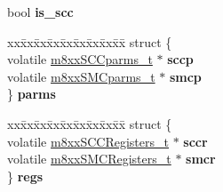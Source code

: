 \begin{DoxyCompactItemize}
\item 
\mbox{\label{structm8xx__console__chan__desc__s_ac400b665e8b186ea18553e57786d08f1}} 
bool {\bfseries is\+\_\+scc}
\item 
\mbox{\label{structm8xx__console__chan__desc__s_ae2109084a3fa835a6ab8444f98ac1bdc}} 
\begin{tabbing}
xx\=xx\=xx\=xx\=xx\=xx\=xx\=xx\=xx\=\kill
struct \{\\
\>volatile \mbox{\hyperlink{structm8xxSCCparms__}{m8xxSCCparms\_t}} $\ast$ {\bfseries sccp}\\
\>volatile \mbox{\hyperlink{structm8xxSMCparms__}{m8xxSMCparms\_t}} $\ast$ {\bfseries smcp}\\
\} {\bfseries parms}\\

\end{tabbing}\item 
\mbox{\label{structm8xx__console__chan__desc__s_a74c22014e631fa9afcb60cf745038e55}} 
\begin{tabbing}
xx\=xx\=xx\=xx\=xx\=xx\=xx\=xx\=xx\=\kill
struct \{\\
\>volatile \mbox{\hyperlink{structm8xxSCCRegisters__}{m8xxSCCRegisters\_t}} $\ast$ {\bfseries sccr}\\
\>volatile \mbox{\hyperlink{structm8xxSMCRegisters__}{m8xxSMCRegisters\_t}} $\ast$ {\bfseries smcr}\\
\} {\bfseries regs}\\


\end{tabbing}
\end{DoxyCompactItemize}
